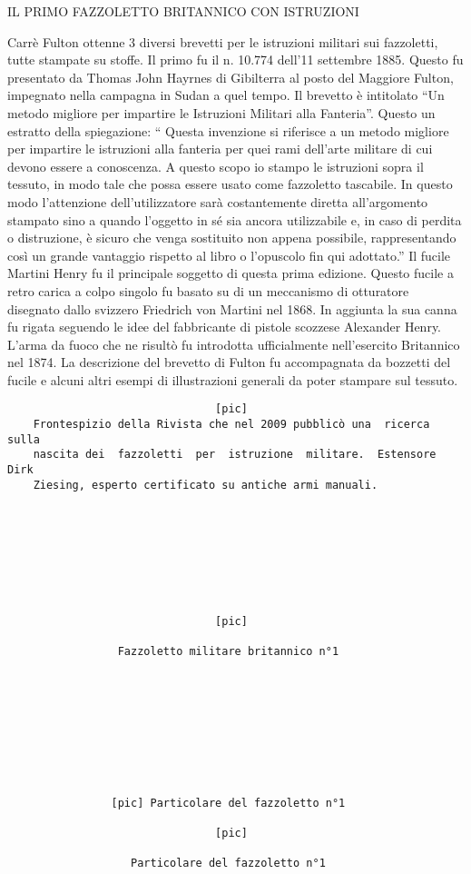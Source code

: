 IL PRIMO FAZZOLETTO BRITANNICO CON ISTRUZIONI

Carrè Fulton ottenne 3 diversi brevetti per le istruzioni militari sui
fazzoletti, tutte stampate su stoffe. Il primo fu il n. 10.774 dell'11
settembre 1885. Questo fu presentato da Thomas John Hayrnes di
Gibilterra al posto del Maggiore Fulton, impegnato nella campagna in
Sudan a quel tempo. Il brevetto è intitolato ``Un metodo migliore per
impartire le Istruzioni Militari alla Fanteria''. Questo un estratto
della spiegazione: `` Questa invenzione si riferisce a un metodo
migliore per impartire le istruzioni alla fanteria per quei rami
dell'arte militare di cui devono essere a conoscenza. A questo scopo io
stampo le istruzioni sopra il tessuto, in modo tale che possa essere
usato come fazzoletto tascabile. In questo modo l'attenzione
dell'utilizzatore sarà costantemente diretta all'argomento stampato sino
a quando l'oggetto in sé sia ancora utilizzabile e, in caso di perdita o
distruzione, è sicuro che venga sostituito non appena possibile,
rappresentando così un grande vantaggio rispetto al libro o l'opuscolo
fin qui adottato.'' Il fucile Martini Henry fu il principale soggetto di
questa prima edizione. Questo fucile a retro carica a colpo singolo fu
basato su di un meccanismo di otturatore disegnato dallo svizzero
Friedrich von Martini nel 1868. In aggiunta la sua canna fu rigata
seguendo le idee del fabbricante di pistole scozzese Alexander Henry.
L'arma da fuoco che ne risultò fu introdotta ufficialmente nell'esercito
Britannico nel 1874. La descrizione del brevetto di Fulton fu
accompagnata da bozzetti del fucile e alcuni altri esempi di
illustrazioni generali da poter stampare sul tessuto.

\begin{verbatim}
                                [pic]
    Frontespizio della Rivista che nel 2009 pubblicò una  ricerca  sulla
    nascita dei  fazzoletti  per  istruzione  militare.  Estensore  Dirk
    Ziesing, esperto certificato su antiche armi manuali.








                                [pic]

                 Fazzoletto militare britannico n°1









                [pic] Particolare del fazzoletto n°1

                                [pic]

                   Particolare del fazzoletto n°1
\end{verbatim}

